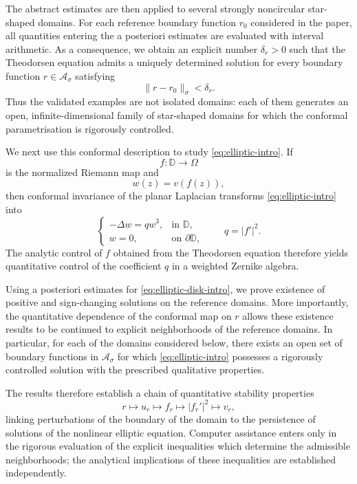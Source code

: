 \documentclass[11pt,a4paper]{amsart}
\begin{document}
The abstract estimates are then applied to several strongly
noncircular star-shaped domains. For each reference boundary function
$r_0$ considered in the paper, all quantities entering the a posteriori
estimates are evaluated with interval arithmetic. As a consequence, we
obtain an explicit number $\delta_r>0$ such that the Theodorsen equation
admits a uniquely determined solution for every boundary function
$r\in\mathcal A_\sigma$ satisfying
\[
\|r-r_0\|_\sigma<\delta_r.
\]
Thus the validated examples are not isolated domains: each of them
generates an open, infinite-dimensional family of star-shaped domains
for which the conformal parametrisation is rigorously controlled.

We next use this conformal description to study
\eqref{eq:elliptic-intro}. If
\[
f:\mathbb D\longrightarrow\Omega
\]
is the normalized Riemann map and
\[
w(z)=v(f(z)),
\]
then conformal invariance of the planar Laplacian transforms
\eqref{eq:elliptic-intro} into
\begin{equation}\label{eq:elliptic-disk-intro}
	\begin{cases}
		-\Delta w=qw^3,&\text{in }\mathbb D,\\
		w=0,&\text{on }\partial\mathbb D,
	\end{cases}
	\qquad
	q=|f'|^2.
\end{equation}
The analytic control of $f$ obtained from the Theodorsen equation
therefore yields quantitative control of the coefficient $q$ in a
weighted Zernike algebra.

Using a posteriori estimates for \eqref{eq:elliptic-disk-intro}, we
prove existence of positive and sign-changing solutions on the
reference domains. More importantly, the quantitative dependence of
the conformal map on $r$ allows these existence results to be continued
to explicit neighborhoods of the reference domains. In particular,
for each of the domains considered below, there exists an open set of
boundary functions in $\mathcal A_\sigma$ for which
\eqref{eq:elliptic-intro} possesses a rigorously controlled solution
with the prescribed qualitative properties.

The results therefore establish a chain of quantitative stability
properties
\[
r
\longmapsto
u_r
\longmapsto
f_r
\longmapsto
|f_r'|^2
\longmapsto
v_r,
\]
linking perturbations of the boundary of the domain to the persistence
of solutions of the nonlinear elliptic equation. Computer assistance
enters only in the rigorous evaluation of the explicit inequalities
which determine the admissible neighborhoods; the analytical
implications of these inequalities are established independently.
\end{document}
